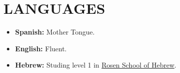 \documentclass[paper=letter,fontsize=11pt]{scrartcl} %
\newcommand{\sepspace}{\vspace*{1em}}		%
\newcommand{\NewPart}[2]{\section*{\uppercase{#1} \small \normalfont #2}}
\newcommand{\Text}[1]{\par       
		\noindent \small #1 
		\normalsize \par}
\begin{document}
\sepspace

\NewPart{LANGUAGES}{}

\begin{itemize}
\item \textbf{Spanish:} Mother Tongue.
\item \textbf{English:} Fluent.
\item \textbf{Hebrew:} Studing level 1 in {\href{https://rosenhebrewschool.com/}{Rosen School of Hebrew}}.
\end{itemize}

\end{document}
